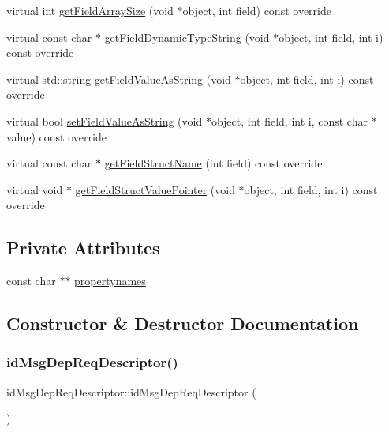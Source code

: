 \begin{DoxyCompactItemize}
\item 
virtual int \hyperlink{classid_msg_dep_req_descriptor_a0f2d677c4de9aeba53ecddf2882f43be}{get\+Field\+Array\+Size} (void $\ast$object, int field) const override
\item 
virtual const char $\ast$ \hyperlink{classid_msg_dep_req_descriptor_aa9030f9516d216af76ee08d6eeaa9dc3}{get\+Field\+Dynamic\+Type\+String} (void $\ast$object, int field, int i) const override
\item 
virtual std\+::string \hyperlink{classid_msg_dep_req_descriptor_a01154250296e827bb3b46ffd9356d403}{get\+Field\+Value\+As\+String} (void $\ast$object, int field, int i) const override
\item 
virtual bool \hyperlink{classid_msg_dep_req_descriptor_ada3744fcc0b6cb75a519a5ecf5d3cebf}{set\+Field\+Value\+As\+String} (void $\ast$object, int field, int i, const char $\ast$value) const override
\item 
virtual const char $\ast$ \hyperlink{classid_msg_dep_req_descriptor_a9a0b0a69461b1f301f0d1e2d64c61f21}{get\+Field\+Struct\+Name} (int field) const override
\item 
virtual void $\ast$ \hyperlink{classid_msg_dep_req_descriptor_a4149a26c3c60d977e462bdf3a91241d4}{get\+Field\+Struct\+Value\+Pointer} (void $\ast$object, int field, int i) const override
\end{DoxyCompactItemize}
\subsection*{Private Attributes}
\begin{DoxyCompactItemize}
\item 
const char $\ast$$\ast$ \hyperlink{classid_msg_dep_req_descriptor_a12975f508bbf2bdd01210c819adee638}{propertynames}
\end{DoxyCompactItemize}


\subsection{Constructor \& Destructor Documentation}
\mbox{\label{classid_msg_dep_req_descriptor_a2f3ef90d3ded0e3218bbd9577c207dfa}} 
\subsubsection{\texorpdfstring{id\+Msg\+Dep\+Req\+Descriptor()}{idMsgDepReqDescriptor()}}
{\footnotesize\ttfamily id\+Msg\+Dep\+Req\+Descriptor\+::id\+Msg\+Dep\+Req\+Descriptor (\begin{DoxyParamCaption}{ }\end{DoxyParamCaption})}

